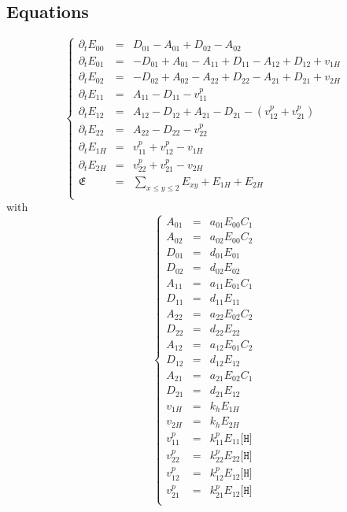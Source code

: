 \documentclass[aps,onecolumn,11pt]{revtex4}
\newcommand{\mychem}[1]{\mathtt{#1}}
\newcommand{\myconc}[1]{\big[#1\big]}
\newcommand{\spproton}{\mychem{H}}
\newcommand{\proton}{\myconc{\spproton}}
\begin{document}
\subsection{Equations}
\begin{equation}
\left\lbrace
\begin{array}{rcl}
\partial_t E_{00} & = & D_{01}-A_{01} + D_{02}-A_{02}\\
\partial_t E_{01} & = & -D_{01}+A_{01} - A_{11} + D_{11} - A_{12} + D_{12} + v_{1H}\\
\partial_t E_{02} & = & -D_{02}+A_{02} - A_{22} + D_{22} - A_{21} + D_{21} + v_{2H}\\
\partial_t E_{11} & = & A_{11}-D_{11} -v^p_{11}\\
\partial_t E_{12} & = & A_{12}-D_{12} + A_{21}-D_{21} - (v^p_{12}+v^p_{21})\\
\partial_t E_{22} & = & A_{22}-D_{22} - v^p_{22}\\
\partial_t E_{1H} & = & v^p_{11}+v^p_{12} - v_{1H}\\
\partial_t E_{2H} & = & v^p_{22}+v^p_{21} - v_{2H}\\
\mathfrak{E}      & = & {\displaystyle \sum_{x\leq y\leq 2} E_{xy}}+E_{1H}+E_{2H}\\
\end{array}
\right.
\end{equation}
with
\begin{equation}
\left\lbrace
\begin{array}{rcl}
A_{01} &= &a_{01} E_{00} C_1\\
A_{02} &= &a_{02} E_{00} C_2\\
D_{01} &= &d_{01} E_{01}\\
D_{02} &= &d_{02} E_{02}\\
A_{11} &= & a_{11} E_{01} C_1 \\
D_{11} &= &d_{11} E_{11}\\
A_{22} &= &a_{22} E_{02} C_2 \\
D_{22} &= &d_{22} E_{22}\\
A_{12} & = & a_{12} E_{01} C_2\\
D_{12} & = & d_{12} E_{12}\\
A_{21} & = & a_{21} E_{02} C_1\\
D_{21} & = & d_{21} E_{12}\\
v_{1H} & = & k_h E_{1H}\\
v_{2H} & = & k_h E_{2H}\\
v^p_{11} & = & k^p_{11} E_{11} \proton \\
v^p_{22} & = & k^p_{22} E_{22} \proton \\
v^p_{12} & = & k^p_{12} E_{12} \proton \\
v^p_{21} & = & k^p_{21} E_{12} \proton \\
\end{array}
\right.
\end{equation}
\end{document}
